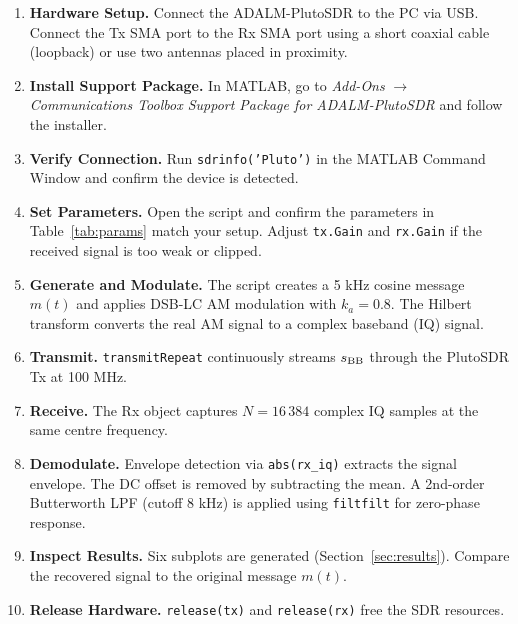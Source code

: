 \documentclass[12pt,a4paper]{article}
\begin{document}
\begin{enumerate}[label=\textbf{Step \arabic*.}, leftmargin=*, itemsep=6pt]

  \item \textbf{Hardware Setup.}
        Connect the ADALM-PlutoSDR to the PC via USB.  Connect the Tx SMA port
        to the Rx SMA port using a short coaxial cable (loopback) or use two
        antennas placed in proximity.

  \item \textbf{Install Support Package.}
        In MATLAB, go to \textit{Add-Ons} $\rightarrow$
        \textit{Communications Toolbox Support Package for ADALM-PlutoSDR} and
        follow the installer.

  \item \textbf{Verify Connection.}
        Run \texttt{sdrinfo('Pluto')} in the MATLAB Command Window and confirm
        the device is detected.

  \item \textbf{Set Parameters.}
        Open the script and confirm the parameters in Table~\ref{tab:params}
        match your setup.  Adjust \texttt{tx.Gain} and \texttt{rx.Gain} if
        the received signal is too weak or clipped.

  \item \textbf{Generate and Modulate.}
        The script creates a 5 kHz cosine message $m(t)$ and applies DSB-LC AM
        modulation with $k_a = 0.8$.  The Hilbert transform converts the real AM
        signal to a complex baseband (IQ) signal.

  \item \textbf{Transmit.}
        \texttt{transmitRepeat} continuously streams $s_{\rm BB}$ through the
        PlutoSDR Tx at 100 MHz.

  \item \textbf{Receive.}
        The Rx object captures $N = 16\,384$ complex IQ samples at the same
        centre frequency.

  \item \textbf{Demodulate.}
        Envelope detection via \texttt{abs(rx\_iq)} extracts the signal
        envelope.  The DC offset is removed by subtracting the mean.  A 2nd-order
        Butterworth LPF (cutoff 8 kHz) is applied using \texttt{filtfilt} for
        zero-phase response.

  \item \textbf{Inspect Results.}
        Six subplots are generated (Section~\ref{sec:results}).  Compare the
        recovered signal to the original message $m(t)$.

  \item \textbf{Release Hardware.}
        \texttt{release(tx)} and \texttt{release(rx)} free the SDR resources.

\end{enumerate}
\end{document}
